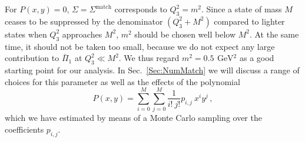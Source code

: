 For $P(x,y) = 0$, $\Sigma=\Sigma^\text{match}$ corresponds to $Q_3^2 = m^2$. Since a state of mass $M$ ceases to be suppressed by the denominator $(Q_3^2 + M^2)$ compared to lighter states when $Q_3^2$ approaches $M^2$, $m^2$ should be chosen well below $M^2$. At the same time, it should not be taken too small, because we do not expect any large contribution to $\bar{\Pi}_1$ at $Q_3^2 \ll M^2$. We thus regard $m^2 = \SI{0.5}{\,\GeV^2}$ as a good starting point for our analysis. In Sec.~\ref{Sec:NumMatch} we will discuss a range of choices for this parameter as well as the effects of the polynomial
\begin{equation}
P(x,y) = \sum_{i=0}^{M} \sum_{j=0}^{M} \frac{1}{i!\ j!} p_{i,j}\ x^i y^j\,,
\label{Eq:PolynomialSigmaMatch}
\end{equation}
which we have estimated by means of a Monte Carlo sampling over the coefficients $p_{i,j}$.